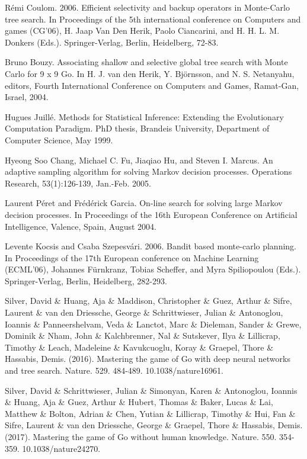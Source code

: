 \begin{thebibliography}{30}
Rémi Coulom. 2006. Efficient selectivity and backup operators in Monte-Carlo tree search. In Proceedings of the 5th international conference on Computers and games (CG'06), H. Jaap Van Den Herik, Paolo Ciancarini, and H. H. L. M. Donkers (Eds.). Springer-Verlag, Berlin, Heidelberg, 72-83.

Bruno Bouzy. Associating shallow and selective global tree search with Monte Carlo for 9 x 9 Go. In H. J. van den Herik, Y. Björnsson, and N. S. Netanyahu, editors, Fourth International Conference on Computers and Games, Ramat-Gan,
Israel, 2004.

Hugues Juillé. Methods for Statistical Inference: Extending the Evolutionary Computation Paradigm. PhD thesis, Brandeis University, Department of Computer Science, May 1999.

Hyeong Soo Chang, Michael C. Fu, Jiaqiao Hu, and Steven I. Marcus. An adaptive sampling algorithm for solving Markov decision processes. Operations Research, 53(1):126-139, Jan.-Feb. 2005.

Laurent Péret and Frédérick Garcia. On-line search for solving large Markov decision processes. In Proceedings of the 16th European Conference on Artificial Intelligence, Valence, Spain, August 2004.

Levente Kocsis and Csaba Szepesvári. 2006. Bandit based monte-carlo planning. In Proceedings of the 17th European conference on Machine Learning (ECML'06), Johannes Fürnkranz, Tobias Scheffer, and Myra Spiliopoulou (Eds.). Springer-Verlag, Berlin, Heidelberg, 282-293. 

Silver, David \& Huang, Aja \& Maddison, Christopher \& Guez, Arthur \& Sifre, Laurent \& van den Driessche, George \& Schrittwieser, Julian \& Antonoglou, Ioannis \& Panneershelvam, Veda \& Lanctot, Marc \& Dieleman, Sander \& Grewe, Dominik \& Nham, John \& Kalchbrenner, Nal \& Sutskever, Ilya \& Lillicrap, Timothy \& Leach, Madeleine \& Kavukcuoglu, Koray \& Graepel, Thore \& Hassabis, Demis. (2016). Mastering the game of Go with deep neural networks and tree search. Nature. 529. 484-489. 10.1038/nature16961. 

Silver, David \& Schrittwieser, Julian \& Simonyan, Karen \& Antonoglou, Ioannis \& Huang, Aja \& Guez, Arthur \& Hubert, Thomas \& Baker, Lucas \& Lai, Matthew \& Bolton, Adrian \& Chen, Yutian \& Lillicrap, Timothy \& Hui, Fan \& Sifre, Laurent \& van den Driessche, George \& Graepel, Thore \& Hassabis, Demis. (2017). Mastering the game of Go without human knowledge. Nature. 550. 354-359. 10.1038/nature24270.


\end{thebibliography}
